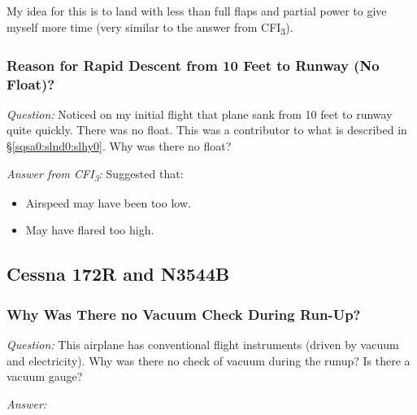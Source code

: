 \documentclass[letterpaper,10pt,titlepage]{article}
\begin{document}
My idea for this is to land with less than full flaps and partial power to give
myself more time (very similar to the answer from CFI\textsubscript{3}).



\subsubsection{Reason for Rapid Descent from 10 Feet to Runway (No Float)?}
\label{sqsa0:slnd0:srdf0}

\emph{Question:} Noticed on my initial flight that plane sank from 10 feet
to runway quite quickly.  There was no float.  This was a contributor to
what is described in \S{}\ref{sqsa0:slnd0:slhy0}.  Why was there no float?

\noindent{}\emph{Answer from CFI\textsubscript{3}:}  Suggested that:
\begin{itemize}
\item Airspeed may have been too low.
\item May have flared too high.
\end{itemize}


\subsection{Cessna 172R and N3544B}
\label{sqsa0:sc7r0}


\subsubsection{Why Was There no Vacuum Check During Run-Up?}
\label{sqsa0:sc7r0:slhy0}

\emph{Question:} This airplane has conventional flight instruments (driven by
vacuum and electricity).  Why was there no check of vacuum during the runup?  Is
there a vacuum gauge?

\noindent{}\emph{Answer:}


%
%
\clearpage
{}
\printindex
\end{document}
